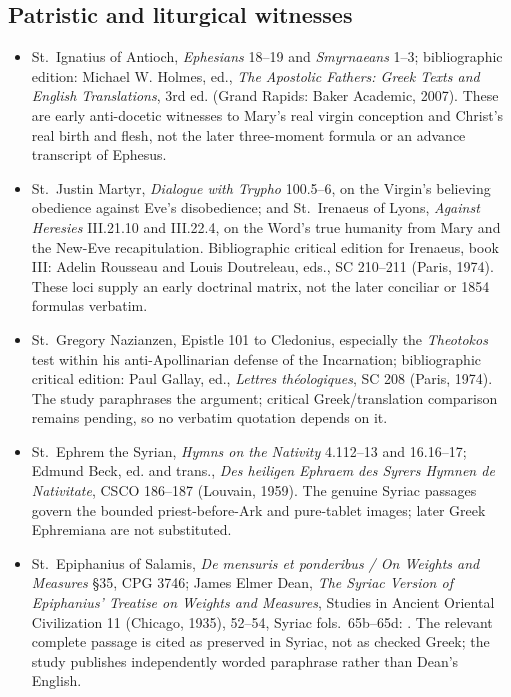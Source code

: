 \subsection{Patristic and liturgical witnesses}

\begin{itemize}
  \item St.~Ignatius of Antioch, \emph{Ephesians} 18--19 and \emph{Smyrnaeans} 1--3; bibliographic edition: Michael W. Holmes, ed., \emph{The Apostolic Fathers: Greek Texts and English Translations}, 3rd ed. (Grand Rapids: Baker Academic, 2007).  These are early anti-docetic witnesses to Mary's real virgin conception and Christ's real birth and flesh, not the later three-moment formula or an advance transcript of Ephesus.
  \item St.~Justin Martyr, \emph{Dialogue with Trypho} 100.5--6, on the Virgin's believing obedience against Eve's disobedience; and St.~Irenaeus of Lyons, \emph{Against Heresies} III.21.10 and III.22.4, on the Word's true humanity from Mary and the New-Eve recapitulation.  Bibliographic critical edition for Irenaeus, book III: Adelin Rousseau and Louis Doutreleau, eds., SC 210--211 (Paris, 1974).  These loci supply an early doctrinal matrix, not the later conciliar or 1854 formulas verbatim.
  \item St.~Gregory Nazianzen, Epistle 101 to Cledonius, especially the \emph{Theotokos} test within his anti-Apollinarian defense of the Incarnation; bibliographic critical edition: Paul Gallay, ed., \emph{Lettres théologiques}, SC 208 (Paris, 1974).  The study paraphrases the argument; critical Greek/translation comparison remains pending, so no verbatim quotation depends on it.
  \item St.~Ephrem the Syrian, \emph{Hymns on the Nativity} 4.112--13 and 16.16--17; Edmund Beck, ed. and trans., \emph{Des heiligen Ephraem des Syrers Hymnen de Nativitate}, CSCO 186--187 (Louvain, 1959).  The genuine Syriac passages govern the bounded priest-before-Ark and pure-tablet images; later Greek Ephremiana are not substituted.
  \item St.~Epiphanius of Salamis, \emph{De mensuris et ponderibus / On Weights and Measures} §35, CPG 3746; James Elmer Dean, \emph{The Syriac Version of Epiphanius' Treatise on Weights and Measures}, Studies in Ancient Oriental Civilization 11 (Chicago, 1935), 52--54, Syriac fols.~65b--65d: .  The relevant complete passage is cited as preserved in Syriac, not as checked Greek; the study publishes independently worded paraphrase rather than Dean's English.

\end{itemize}
